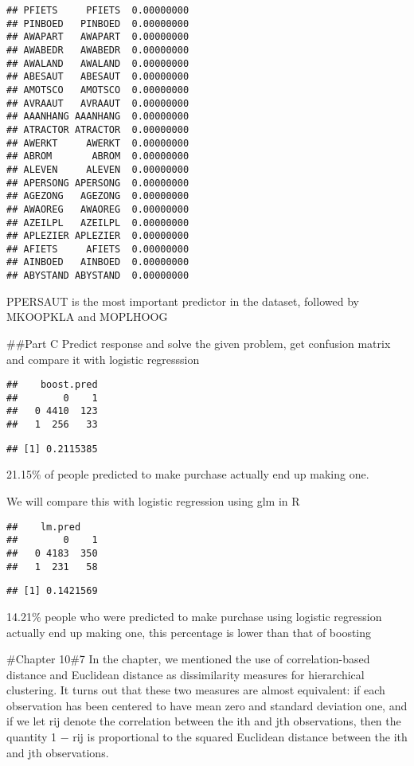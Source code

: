 \documentclass[
]{article}
\begin{document}
\begin{verbatim}
## PFIETS     PFIETS  0.00000000
## PINBOED   PINBOED  0.00000000
## AWAPART   AWAPART  0.00000000
## AWABEDR   AWABEDR  0.00000000
## AWALAND   AWALAND  0.00000000
## ABESAUT   ABESAUT  0.00000000
## AMOTSCO   AMOTSCO  0.00000000
## AVRAAUT   AVRAAUT  0.00000000
## AAANHANG AAANHANG  0.00000000
## ATRACTOR ATRACTOR  0.00000000
## AWERKT     AWERKT  0.00000000
## ABROM       ABROM  0.00000000
## ALEVEN     ALEVEN  0.00000000
## APERSONG APERSONG  0.00000000
## AGEZONG   AGEZONG  0.00000000
## AWAOREG   AWAOREG  0.00000000
## AZEILPL   AZEILPL  0.00000000
## APLEZIER APLEZIER  0.00000000
## AFIETS     AFIETS  0.00000000
## AINBOED   AINBOED  0.00000000
## ABYSTAND ABYSTAND  0.00000000
\end{verbatim}

PPERSAUT is the most important predictor in the dataset, followed by
MKOOPKLA and MOPLHOOG

\#\#Part C Predict response and solve the given problem, get confusion
matrix and compare it with logistic regresssion

\begin{verbatim}
##    boost.pred
##        0    1
##   0 4410  123
##   1  256   33
\end{verbatim}

\begin{verbatim}
## [1] 0.2115385
\end{verbatim}

21.15\% of people predicted to make purchase actually end up making one.

We will compare this with logistic regression using glm in R

\begin{verbatim}
##    lm.pred
##        0    1
##   0 4183  350
##   1  231   58
\end{verbatim}

\begin{verbatim}
## [1] 0.1421569
\end{verbatim}

14.21\% people who were predicted to make purchase using logistic
regression actually end up making one, this percentage is lower than
that of boosting

\#Chapter 10\#7 In the chapter, we mentioned the use of
correlation-based distance and Euclidean distance as dissimilarity
measures for hierarchical clustering. It turns out that these two
measures are almost equivalent: if each observation has been centered to
have mean zero and standard deviation one, and if we let rij denote the
correlation between the ith and jth observations, then the quantity 1 −
rij is proportional to the squared Euclidean distance between the ith
and jth observations.
\end{document}
